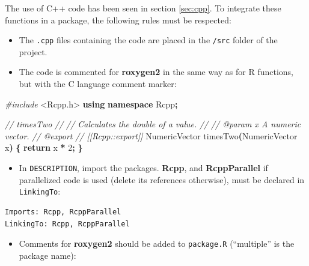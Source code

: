 \documentclass[
  12pt,
  american,
  a4paper,
  extrafontsizes,onecolumn,openright
  ]{memoir}
\newenvironment{Shaded}{\begin{snugshade}}{\end{snugshade}}
\newcommand{\CommentTok}[1]{\textcolor[rgb]{0.56,0.35,0.01}{\textit{#1}}}
\newcommand{\ControlFlowTok}[1]{\textcolor[rgb]{0.13,0.29,0.53}{\textbf{#1}}}
\newcommand{\DecValTok}[1]{\textcolor[rgb]{0.00,0.00,0.81}{#1}}
\newcommand{\ImportTok}[1]{#1}
\newcommand{\KeywordTok}[1]{\textcolor[rgb]{0.13,0.29,0.53}{\textbf{#1}}}
\newcommand{\NormalTok}[1]{#1}
\newcommand{\OperatorTok}[1]{\textcolor[rgb]{0.81,0.36,0.00}{\textbf{#1}}}
\newcommand{\PreprocessorTok}[1]{\textcolor[rgb]{0.56,0.35,0.01}{\textit{#1}}}
\providecommand{\tightlist}{%
  \setlength{\itemsep}{0pt}\setlength{\parskip}{0pt}}
\begin{document}
The use of C++ code has been seen in section \ref{sec:cpp}.
To integrate these functions in a package, the following rules must be respected:

\begin{itemize}
\tightlist
\item
  The \texttt{.cpp} files containing the code are placed in the \texttt{/src} folder of the project.
\item
  The code is commented for \textbf{roxygen2} in the same way as for R functions, but with the C language comment marker:
\end{itemize}

\scriptsize

\begin{Shaded}
\begin{Highlighting}[]
\PreprocessorTok{\#include }\ImportTok{\textless{}Rcpp.h\textgreater{}}
\KeywordTok{using} \KeywordTok{namespace}\NormalTok{ Rcpp}\OperatorTok{;}

\CommentTok{//\textquotesingle{} timesTwo}
\CommentTok{//\textquotesingle{}}
\CommentTok{//\textquotesingle{} Calculates the double of a value.}
\CommentTok{//\textquotesingle{}}
\CommentTok{//\textquotesingle{} @param x A numeric vector.}
\CommentTok{//\textquotesingle{} @export}
\CommentTok{// [[Rcpp::export]]}
\NormalTok{NumericVector timesTwo}\OperatorTok{(}\NormalTok{NumericVector x}\OperatorTok{)} \OperatorTok{\{}
  \ControlFlowTok{return}\NormalTok{ x }\OperatorTok{*} \DecValTok{2}\OperatorTok{;}
\OperatorTok{\}}
\end{Highlighting}
\end{Shaded}

\normalsize

\begin{itemize}
\tightlist
\item
  In \texttt{DESCRIPTION}, import the packages.
  \textbf{Rcpp}, and \textbf{RcppParallel} if parallelized code is used (delete its references otherwise), must be declared in \texttt{LinkingTo}:
\end{itemize}

\begin{verbatim}
Imports: Rcpp, RcppParallel
LinkingTo: Rcpp, RcppParallel
\end{verbatim}

\begin{itemize}
\tightlist
\item
  Comments for \textbf{roxygen2} should be added to \texttt{package.R} (\enquote{multiple} is the package name):
\end{itemize}
\end{document}
